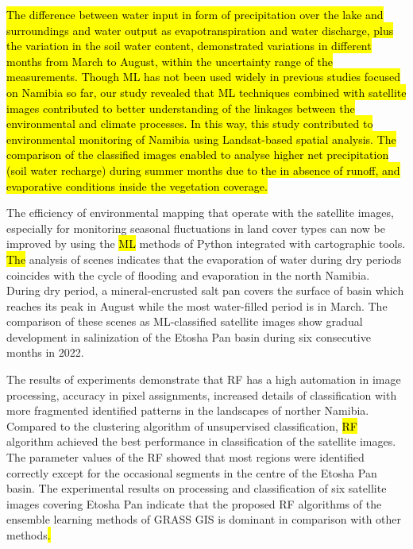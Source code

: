 \documentclass[climate,article,submit,pdftex,moreauthors]{Definitions/mdpi}
\begin{document}
\hl{The difference between water input in form of precipitation over the lake and surroundings and water output as evapotranspiration and water discharge, plus the variation in the soil water content, demonstrated variations in different months from March to August, within the uncertainty range of the measurements. Though ML  has not been used widely in previous studies focused on Namibia so far, our study revealed that ML techniques combined with satellite images contributed to better understanding of the linkages between the environmental and climate processes. In this way, this study contributed to environmental monitoring of Namibia using Landsat-based spatial analysis. The comparison of the classified images enabled to analyse higher net precipitation (soil water recharge) during summer months due to the in absence of runoff, and evaporative conditions inside the vegetation coverage.}

The efficiency of environmental mapping that operate with the satellite images, especially for monitoring seasonal fluctuations in land cover types can now be improved by using the \hl{ML} methods of Python integrated with cartographic tools. \hl{The} analysis of scenes indicates that the evaporation of water during dry periods coincides with the cycle of flooding and evaporation in the north Namibia. During dry period, a mineral-encrusted salt pan covers the surface of basin which reaches its peak in August while the most water-filled period is in March. The comparison of these scenes as ML-classified satellite images show gradual development in salinization of the Etosha Pan basin during six consecutive months in 2022. 

The results of experiments demonstrate that RF has a high automation in image processing, accuracy in pixel assignments, increased details of classification with more fragmented identified patterns in the landscapes of norther Namibia. Compared to the clustering algorithm of unsupervised classification, \hl{RF} algorithm achieved the best performance in classification of the satellite images. The parameter values of the RF showed that most regions were identified correctly except for the occasional segments in the centre of the Etosha Pan basin.\hl{ }The experimental results on processing and classification of six satellite images covering Etosha Pan indicate that the proposed RF algorithms of the ensemble learning methods of GRASS GIS is dominant in comparison with other methods\hl{.}
\end{document}
